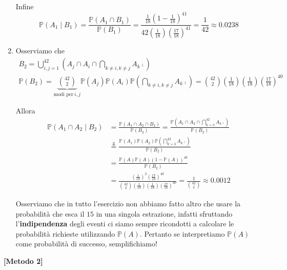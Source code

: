 \begin{enumerate}
Infine\begin{equation*}
\mathbb{P}( A_{1} \mid B_{1}) =\frac{\mathbb{P}( A_{1} \cap B_{1})}{\mathbb{P}( B_{1})} =\frac{\frac{1}{18}\left( 1-\frac{1}{18}\right)^{41}}{42\left(\frac{1}{18}\right)\left(\frac{17}{18}\right)^{41}} =\frac{1}{42} \approx 0.0238
\end{equation*}
\item Osserviamo che\begin{gather*}
B_{2} =\bigcup _{i,j=1}^{42}\left( A_{j} \cap A_{i} \cap \bigcap _{k\neq i,k\neq j} A_{k}\comp\right)\\
\mathbb{P}( B_{2}) =\underbrace{\binom{42}{2}}_{\text{modi per} \ i,j}\mathbb{P}( A_{j})\mathbb{P}( A_{i})\mathbb{P}\left(\bigcap _{k\neq i,k\neq j} A_{k}\comp\right) =\binom{42}{2}\left(\frac{1}{18}\right)\left(\frac{1}{18}\right)\left(\frac{17}{18}\right)^{40}
\end{gather*}

Allora\begin{equation*}
\begin{aligned}
\mathbb{P}( A_{1} \cap A_{2} \mid B_{2}) & =\frac{\mathbb{P}( A_{1} \cap A_{2} \cap B_{2})}{\mathbb{P}( B_{2})} =\frac{\mathbb{P}\left( A_{1} \cap A_{2} \cap \bigcap _{k=3}^{42} A_{k}\comp\right)}{\mathbb{P}( B_{2})}\\
 & \overset{\Bot }{=}\frac{\mathbb{P}( A_{1})\mathbb{P}( A_{2})\mathbb{P}\left(\bigcap _{k=3}^{42} A_{k}\comp\right)}{\mathbb{P}( B_{2})}\\
 & =\frac{\mathbb{P}( A)\mathbb{P}( A)( 1-\mathbb{P}( A))^{40}}{\mathbb{P}( B_{2})}\\
 & =\frac{\left(\frac{1}{18}\right)^{2}\left(\frac{17}{18}\right)^{40}}{\binom{42}{2}\left(\frac{1}{18}\right)\left(\frac{1}{18}\right)\left(\frac{17}{18}\right)^{40}} =\frac{1}{\binom{42}{2}} \approx 0.0012
\end{aligned}
\end{equation*}

\begin{oss}
Osserviamo che in tutto l'esercizio non abbiamo fatto altro che usare la probabilità che esca il $15$ in una singola estrazione, infatti sfruttando l'\textbf{indipendenza} degli eventi ci siamo sempre ricondotti a calcolare le probabilità richieste utilizzando $\mathbb{P}( A)$. Pertanto se interpretiamo $\mathbb{P}( A)$ come probabilità di successo, semplifichiamo!
\end{oss}
\end{enumerate}
\textbf{[Metodo 2]}

